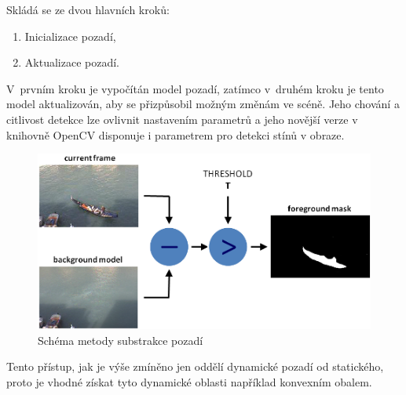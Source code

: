 Skládá se ze dvou hlavních kroků:
 \begin{enumerate}
    \item{Inicializace pozadí,}
    \item{Aktualizace pozadí.}
 \end{enumerate}
 V~prvním kroku je vypočítán model pozadí, zatímco v~druhém kroku je tento model aktualizován, aby se přizpůsobil možným změnám ve scéně. \cite{openCV:MOG}
Jeho chování a citlivost detekce lze ovlivnit nastavením parametrů a jeho novější verze v knihovně OpenCV disponuje i parametrem pro detekci stínů v obraze.
\begin{figure}[H]
  \centering
  \includegraphics[width=12cm]{figures/mog_scheme}
  \caption{Schéma metody substrakce pozadí \cite{openCV:MOG}}
  \label{mog_scheme}
\end{figure}

Tento přístup, jak je výše zmíněno jen oddělí dynamické pozadí od statického, proto je vhodné získat tyto dynamické oblasti například konvexním obalem.

